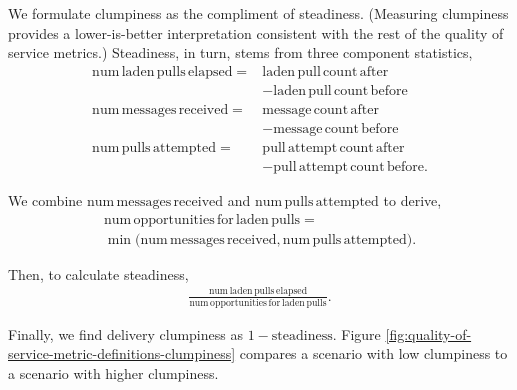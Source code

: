 We formulate clumpiness as the compliment of steadiness.
(Measuring clumpiness provides a lower-is-better interpretation consistent with the rest of the quality of service metrics.)
Steadiness, in turn, stems from three component statistics,
\begin{align*}
\mathrm{num\,laden\,pulls\,elapsed} =& \mathrm{laden\,pull\,count\,after} \\
  &- \mathrm{laden\,pull\,count\,before} \\
\mathrm{num\,messages\,received} =& \mathrm{message\,count\,after} \\
  &- \mathrm{message\,count\,before} \\
\mathrm{num\,pulls\,attempted} =& \mathrm{pull\,attempt\,count\,after} \\
  &- \mathrm{pull\,attempt\,count\,before}
.
\end{align*}

We combine $\mathrm{num\,messages\,received}$ and $\mathrm{num\,pulls\,attempted}$ to derive,
\begin{align*}
  \mathrm{num\,opportunities\,for\,laden\,pulls} = \\
   \min\Big(\mathrm{num\,messages\,received}, \mathrm{num\,pulls\,attempted}\Big).
\end{align*}

Then, to calculate steadiness,
\begin{align*}
  \frac{
    \mathrm{num\,laden\,pulls\,elapsed}
  }{
    \mathrm{num\,opportunities\,for\,laden\,pulls}
  }.
\end{align*}

Finally, we find delivery clumpiness as $1 - \mathrm{steadiness}$.
Figure \ref{fig:quality-of-service-metric-definitions-clumpiness} compares a scenario with low clumpiness to a scenario with higher clumpiness.
